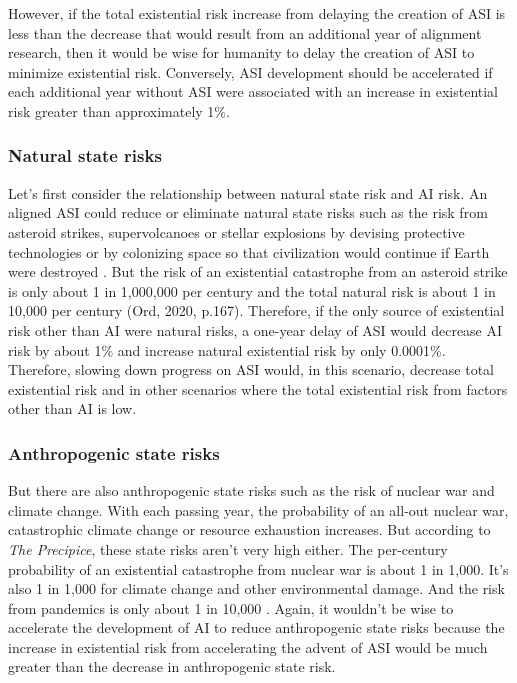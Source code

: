 \documentclass{article}
\begin{document}
However, if the total existential risk increase from delaying the creation of ASI is less than the decrease that would result from an additional year of alignment research, then it would be wise for humanity to delay the creation of ASI to minimize existential risk. Conversely, ASI development should be accelerated if each additional year without ASI were associated with an increase in existential risk greater than approximately 1\%.

\subsubsection{Natural state risks}

Let’s first consider the relationship between natural state risk and AI risk. An aligned ASI could reduce or eliminate natural state risks such as the risk from asteroid strikes, supervolcanoes or stellar explosions by devising protective technologies or by colonizing space so that civilization would continue if Earth were destroyed \cite{superintelligence}. But the risk of an existential catastrophe from an asteroid strike is only about 1 in 1,000,000 per century and the total natural risk is about 1 in 10,000 per century (Ord, 2020, p.167). Therefore, if the only source of existential risk other than AI were natural risks, a one-year delay of ASI would decrease AI risk by about 1\% and increase natural existential risk by only 0.0001\%. Therefore, slowing down progress on ASI would, in this scenario, decrease total existential risk and in other scenarios where the total existential risk from factors other than AI is low.

\subsubsection{Anthropogenic state risks}

But there are also anthropogenic state risks such as the risk of nuclear war and climate change. With each passing year, the probability of an all-out nuclear war, catastrophic climate change or resource exhaustion increases. But according to \textit{The Precipice}, these state risks aren’t very high either. The per-century probability of an existential catastrophe from nuclear war is about 1 in 1,000. It’s also 1 in 1,000 for climate change and other environmental damage. And the risk from pandemics is only about 1 in 10,000 \cite{theprecipice}. Again, it wouldn’t be wise to accelerate the development of AI to reduce anthropogenic state risks because the increase in existential risk from accelerating the advent of ASI would be much greater than the decrease in anthropogenic state risk.
\end{document}
